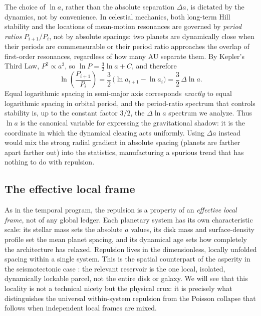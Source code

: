\documentclass[12pt,a4paper]{article}
\begin{document}
The choice of $\ln a$, rather than the absolute separation $\Delta a$, is dictated by the dynamics, not by convenience. In celestial mechanics, both long-term Hill stability and the locations of mean-motion resonances are governed by \emph{period ratios} $P_{i+1}/P_i$, not by absolute spacings: two planets are dynamically close when their periods are commensurable or their period ratio approaches the overlap of first-order resonances, regardless of how many AU separate them. By Kepler's Third Law, $P^2\propto a^3$, so $\ln P = \tfrac{3}{2}\ln a + C$, and therefore
\begin{equation}
\ln\!\left(\frac{P_{i+1}}{P_i}\right) = \frac{3}{2}\,\bigl(\ln a_{i+1}-\ln a_i\bigr) = \frac{3}{2}\,\Delta\ln a .
\end{equation}
Equal logarithmic spacing in semi-major axis corresponds \emph{exactly} to equal logarithmic spacing in orbital period, and the period-ratio spectrum that controls stability is, up to the constant factor $3/2$, the $\Delta\ln a$ spectrum we analyze. Thus $\ln a$ is the canonical variable for expressing the gravitational shadow: it is the coordinate in which the dynamical clearing acts uniformly. Using $\Delta a$ instead would mix the strong radial gradient in absolute spacing (planets are farther apart farther out) into the statistics, manufacturing a spurious trend that has nothing to do with repulsion.

\subsection{The effective local frame}

As in the temporal program, the repulsion is a property of an \emph{effective local frame}, not of any global ledger. Each planetary system has its own characteristic scale: its stellar mass sets the absolute $a$ values, its disk mass and surface-density profile set the mean planet spacing, and its dynamical age sets how completely the architecture has relaxed. Repulsion lives in the dimensionless, locally unfolded spacing within a single system. This is the spatial counterpart of the asperity in the seismotectonic case \citep{chen2026fault}: the relevant reservoir is the one local, isolated, dynamically lockable parcel, not the entire disk or galaxy. We will see that this locality is not a technical nicety but the physical crux: it is precisely what distinguishes the universal within-system repulsion from the Poisson collapse that follows when independent local frames are mixed.
\end{document}
